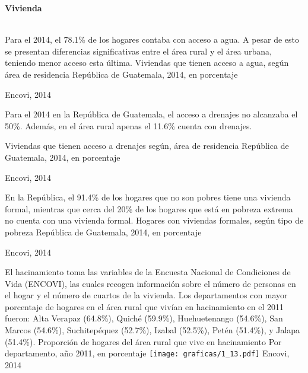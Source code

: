 \begin{center}
\textbf{\color{color2}\LARGE \thesection} \quad  \textbf{\LARGE Vivienda} 
\end{center}
$\ $ \\[-5cm]
%
{%
	Para el 2014, el 78.1\% de los hogares contaba con acceso a agua. A pesar de esto se presentan diferencias significativas entre el área rural y el área urbana, teniendo menor acceso esta última.
}%
{%
	Viviendas que tienen acceso a agua, según área de residencia} %
{%
	República de Guatemala, 2014, en porcentaje} %
{%
	\begin{tikzpicture}[x=1pt,y=1pt]    \end{tikzpicture}}%
{%
	Encovi, 2014} %
	


%
{%
	
	Para el 2014 en la República de Guatemala, el acceso a drenajes no alcanzaba el 50\%. Además, en el área rural apenas el 11.6\% cuenta con drenajes. 
	
}%
{%
	Viviendas que tienen acceso a drenajes según, área	 de residencia} %
{%
	República de Guatemala, 2014, en porcentaje} %
{%
	\begin{tikzpicture}[x=1pt,y=1pt]    \end{tikzpicture}}%
{%
	Encovi, 2014} %




{%
	En la República, el 91.4\% de los hogares que no son pobres tiene una vivienda formal, mientras que cerca del 20\%  de los hogares que está en pobreza extrema no cuenta con una vivienda formal.  
 }%
{%
 Hogares con viviendas formales, según tipo de pobreza} %
{%
 República de Guatemala, 2014, en porcentaje} %
{%
 \begin{tikzpicture}[x=1pt,y=1pt]    \end{tikzpicture}}%
{%
 Encovi, 2014} %




%
{%
	El hacinamiento toma las variables de la Encuesta Nacional de Condiciones de Vida (ENCOVI), las cuales  recogen información sobre el número de personas en el hogar y el número de cuartos de la vivienda. 	Los departamentos con mayor porcentaje de hogares en el área rural que vivían en hacinamiento en el 2011 fueron: Alta Verapaz (64.8\%), Quiché (59.9\%), Huehuetenango (54.6\%), San Marcos (54.6\%), Suchitepéquez (52.7\%), Izabal (52.5\%), Petén (51.4\%), y Jalapa (51.4\%). }%
{%
	Proporción de hogares del área rural que vive en hacinamiento
} %
{%
	Por departamento, año 2011, en porcentaje} %
{%
	\texttt{[image: graficas/1\_13.pdf]}}%
{%
 Encovi, 2014} %


